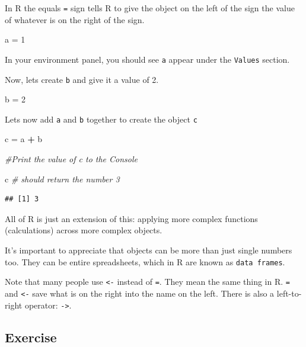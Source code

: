 \documentclass[]{book}
\makeatletter
\newenvironment{Shaded}{\begin{snugshade}}{\end{snugshade}}
\newcommand{\DecValTok}[1]{\textcolor[rgb]{0.00,0.00,0.81}{#1}}
\newcommand{\StringTok}[1]{\textcolor[rgb]{0.31,0.60,0.02}{#1}}
\newcommand{\CommentTok}[1]{\textcolor[rgb]{0.56,0.35,0.01}{\textit{#1}}}
\newcommand{\OperatorTok}[1]{\textcolor[rgb]{0.81,0.36,0.00}{\textbf{#1}}}
\newcommand{\NormalTok}[1]{#1}
\newenvironment{kframe}{%
\medskip{}
\setlength{\fboxsep}{.8em}
 \def\at@end@of@kframe{}%
 \ifinner\ifhmode%
  \def\at@end@of@kframe{\end{minipage}}%
  \begin{minipage}{\columnwidth}%
 \fi\fi%
 \def\FrameCommand##1{\hskip\@totalleftmargin \hskip-\fboxsep
 \colorbox{shadecolor}{##1}\hskip-\fboxsep
     \hskip-\linewidth \hskip-\@totalleftmargin \hskip\columnwidth}%
 \MakeFramed {\advance\hsize-\width
   \@totalleftmargin\z@ \linewidth\hsize
   \@setminipage}}%
 {\par\unskip\endMakeFramed%
 \at@end@of@kframe}
\renewenvironment{Shaded}{\begin{kframe}}{\end{kframe}}
\makeatother
\begin{document}
In R the equals \texttt{=} sign tells R to give the object on the left
of the sign the value of whatever is on the right of the sign.

\begin{Shaded}
\begin{Highlighting}[]
\NormalTok{a =}\StringTok{ }\DecValTok{1}
\end{Highlighting}
\end{Shaded}

In your environment panel, you should see \texttt{a} appear under the
\texttt{Values} section.

Now, lets create \texttt{b} and give it a value of 2.

\begin{Shaded}
\begin{Highlighting}[]
\NormalTok{b =}\StringTok{ }\DecValTok{2}
\end{Highlighting}
\end{Shaded}

Lets now add \texttt{a} and \texttt{b} together to create the object
\texttt{c}

\begin{Shaded}
\begin{Highlighting}[]
\NormalTok{c =}\StringTok{ }\NormalTok{a }\OperatorTok{+}\StringTok{ }\NormalTok{b }

\CommentTok{#Print the value of c to the Console}

\NormalTok{c }\CommentTok{# should return the number 3}
\end{Highlighting}
\end{Shaded}

\begin{verbatim}
## [1] 3
\end{verbatim}

All of R is just an extension of this: applying more complex functions
(calculations) across more complex objects.

It's important to appreciate that objects can be more than just single
numbers too. They can be entire spreadsheets, which in R are known as
\texttt{data\ frames}.

Note that many people use \texttt{\textless{}-} instead of \texttt{=}.
They mean the same thing in R. \texttt{=} and \texttt{\textless{}-} save
what is on the right into the name on the left. There is also a
left-to-right operator: \texttt{-\textgreater{}}.

\subsection{Exercise}\label{exercise-3}
\end{document}
